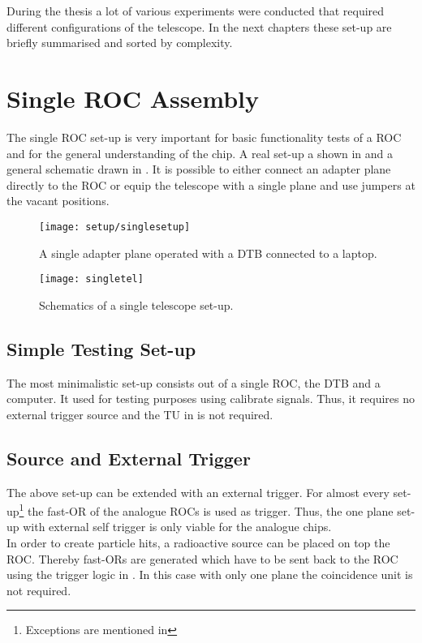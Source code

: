During the thesis a lot of various experiments were conducted that required different configurations of the telescope. In the next chapters these set-up are briefly summarised and sorted by complexity. 
\section{Single \ac{ROC} Assembly}
The single \ac{ROC} set-up  is very important for basic functionality tests of a \ac{ROC} and for the general understanding of the chip. A real set-up a shown in  and a general schematic drawn in . It is possible to either connect an adapter plane directly to the \ac{ROC} or equip the telescope with a single plane and use jumpers at the vacant positions.
\begin{figure}[ht]
	\centering
	\texttt{[image: setup/singlesetup]}
	\caption{A single adapter plane operated with a \ac{DTB} connected to a laptop.}
	\label{psingleroc}
\end{figure}\no
\begin{figure}[ht]
	\centering
	\texttt{[image: singletel]}
	\caption{Schematics of a single telescope set-up.}
	\label{psinglerocdraw}
\end{figure}\no
\subsection{Simple Testing Set-up}
The most minimalistic set-up consists out of a single \ac{ROC}, the \ac{DTB} and a computer. It used for testing purposes using calibrate signals. Thus, it requires no external trigger source and the \ac{TU} in  is not required.
\subsection{Source and External Trigger}
The above set-up can be extended with an external trigger. For almost every set-up\footnote{Exceptions are mentioned in } the fast-OR of the analogue \ac{ROC}s is used as trigger. Thus, the one plane set-up with external self trigger is only viable for the analogue chips.\\
In order to create particle hits, a radioactive  source can be placed on top the \ac{ROC}. Thereby fast-ORs are generated which have to be sent back to the \ac{ROC} using the trigger logic in . In this case with only one plane the coincidence unit is not required.

